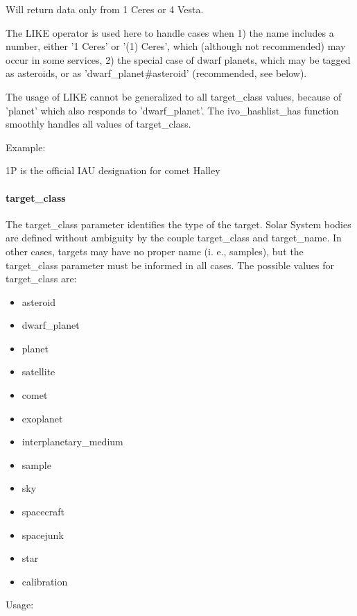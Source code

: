 \documentclass[11pt,a4paper]{ivoa}
\begin{document}
Will return data only from 1 Ceres or 4 Vesta.

The LIKE operator is used here to handle cases when 1) the name includes a number, either '1 Ceres' or '(1) Ceres', which (although not recommended) may occur in some services, 2) the special case of dwarf planets, which may be tagged as asteroids, or as 'dwarf\_planet\#asteroid' (recommended, see below). 

The usage of LIKE cannot be generalized to all target\_class values, because of  'planet' which also responds to 'dwarf\_planet'. The ivo\_hashlist\_has function smoothly handles all values of target\_class.


Example:

1P is the official IAU designation for comet Halley

\paragraph{target\_class}

The target\_class parameter identifies the type of the target. Solar System bodies are defined without ambiguity by the couple target\_class and target\_name. In other cases, targets may have no proper name (i. e., samples), but the target\_class parameter must be informed in all cases. The possible values for target\_class are:

\begin{itemize}
\item asteroid
\item dwarf\_planet
\item planet
\item satellite
\item comet
\item exoplanet
\item interplanetary\_medium
\item sample
\item sky
\item spacecraft
\item spacejunk
\item star
\item calibration
\end{itemize}

Usage:
\end{document}
